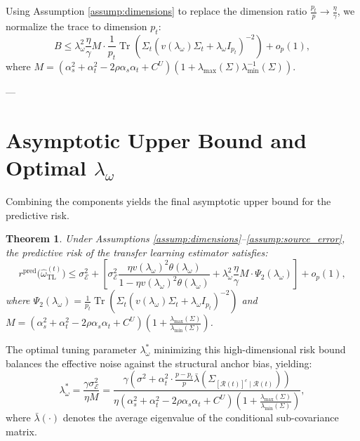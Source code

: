 \documentclass{article}
\newtheorem{theorem}{Theorem}
\begin{document}
Using Assumption \ref{assump:dimensions} to replace the dimension ratio $\frac{p_t}{p} \to \frac{\eta}{\gamma}$, we normalize the trace to dimension $p_t$:
\begin{equation}
B \le \lambda_\omega^2 \frac{\eta}{\gamma} M \cdot \frac{1}{p_t} \operatorname{Tr}\left( \Sigma_t (v(\lambda_\omega)\Sigma_t + \lambda_\omega I_{p_t})^{-2} \right) + o_p(1),
\end{equation}
where $M = (\alpha_s^2 + \alpha_t^2 - 2 \rho \alpha_s \alpha_t + C^U)\left(1 + \lambda_{\max}(\Sigma)\lambda_{\min}^{-1}(\Sigma)\right)$.

---

\section{Asymptotic Upper Bound and Optimal $\lambda_\omega$}
Combining the components yields the final asymptotic upper bound for the predictive risk.

\begin{theorem}
Under Assumptions \ref{assump:dimensions}--\ref{assump:source_error}, the predictive risk of the transfer learning estimator satisfies:
\begin{equation}
r^{\mathrm{pred}}\!\bigl(\hat\omega_{\mathrm{TL}}^{(t)}\bigr) \le \sigma_{\mathcal{E}}^2 + \left[ \sigma_{\mathcal{E}}^2 \frac{\eta v(\lambda_\omega)^2 \theta(\lambda_\omega)}{1 - \eta v(\lambda_\omega)^2 \theta(\lambda_\omega)} + \lambda_\omega^2 \frac{\eta}{\gamma} M \cdot \Psi_2(\lambda_\omega) \right] + o_p(1),
\end{equation}
where $\Psi_2(\lambda_\omega) = \frac{1}{p_t} \operatorname{Tr}\left( \Sigma_t (v(\lambda_\omega)\Sigma_t + \lambda_\omega I_{p_t})^{-2} \right)$ and $M = (\alpha_s^2 + \alpha_t^2 - 2 \rho \alpha_s \alpha_t + C^U)\left(1 + \frac{\lambda_{\max}(\Sigma)}{\lambda_{\min}(\Sigma)}\right)$.
\end{theorem}

The optimal tuning parameter $\lambda_\omega^*$ minimizing this high-dimensional risk bound balances the effective noise against the structural anchor bias, yielding:
\begin{equation}
\lambda_\omega^* = \frac{\gamma \sigma_{\mathcal{E}}^2}{\eta M} = \frac{\gamma \left(\sigma^2 + \alpha_t^2 \cdot \frac{p-p_t}{p} \bar{\lambda}(\Sigma_{[\mathcal{R}(t)]^c \mid \mathcal{R}(t)})\right)}{\eta (\alpha_s^2 + \alpha_t^2 - 2\rho\alpha_s\alpha_t + C^U)\left(1 + \frac{\lambda_{\max}(\Sigma)}{\lambda_{\min}(\Sigma)}\right)},
\end{equation}
where $\bar{\lambda}(\cdot)$ denotes the average eigenvalue of the conditional sub-covariance matrix.
\end{document}

